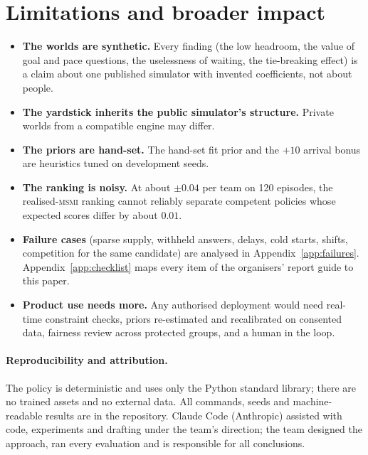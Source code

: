 \documentclass[10pt]{article}
\newcommand{\msmi}{\textsc{msmi}}
\begin{document}
\section{Limitations and broader impact}\label{sec:limits}

\begin{itemize}
\item \textbf{The worlds are synthetic.} Every finding (the low headroom, the value of goal and pace questions, the uselessness of waiting, the tie-breaking effect) is a claim about one published simulator with invented coefficients, not about people.
\item \textbf{The yardstick inherits the public simulator's structure.} Private worlds from a compatible engine may differ.
\item \textbf{The priors are hand-set.} The hand-set fit prior and the $+10$ arrival bonus are heuristics tuned on development seeds.
\item \textbf{The ranking is noisy.} At about $\pm0.04$ per team on 120 episodes, the realised-\msmi{} ranking cannot reliably separate competent policies whose expected scores differ by about $0.01$.
\item \textbf{Failure cases} (sparse supply, withheld answers, delays, cold starts, shifts, competition for the same candidate) are analysed in Appendix~\ref{app:failures}. Appendix~\ref{app:checklist} maps every item of the organisers' report guide to this paper.
\item \textbf{Product use needs more.} Any authorised deployment would need real-time constraint checks, priors re-estimated and recalibrated on consented data, fairness review across protected groups, and a human in the loop.
\end{itemize}

\paragraph{Reproducibility and attribution.} The policy is deterministic and uses only the Python standard library; there are no trained assets and no external data. All commands, seeds and machine-readable results are in the repository. Claude Code (Anthropic) assisted with code, experiments and drafting under the team's direction; the team designed the approach, ran every evaluation and is responsible for all conclusions.
\end{document}
